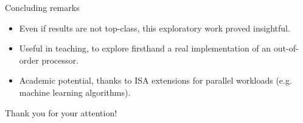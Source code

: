 \documentclass{beamer}
\begin{document}
\begin{frame}{Concluding remarks}
  \begin{itemize}[<+->]
    \item Even if results are not top-class, this exploratory work proved insightful.
    \item Useful in teaching, to explore firsthand a real implementation of an out-of-order processor.
    \item Academic potential, thanks to ISA extensions for parallel workloads (e.g. machine learning algorithms).
  \end{itemize}
\end{frame}

\begin{frame}[standout]
  Thank you for your attention!
\end{frame}
\end{document}

